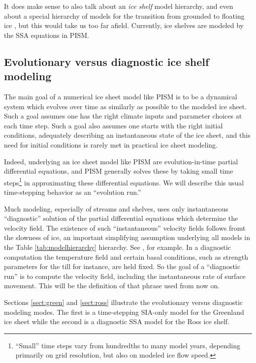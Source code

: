 \documentclass[11pt,final]{amsart}
\begin{document}
It does make sense to also talk about an \emph{ice shelf} model hierarchy, and even about a special hierarchy of models for the transition from grounded to floating ice \cite{SchoofMarine1}, but this would take us too far afield.  Currently, ice shelves are modeled by the SSA equations in PISM.


\subsection{Evolutionary versus diagnostic ice shelf modeling} \label{subsect:basicmodes}    The main goal of a numerical ice sheet model like PISM is to be a dynamical system which evolves over time as similarly as possible to the modeled ice sheet.  Such a goal assumes one has the right climate inputs and parameter choices at each time step.  Such a goal also assumes one starts with the right initial conditions, adequately describing an instantaneous state of the ice sheet, and this need for initial conditions is rarely met in practical ice sheet modeling.  

Indeed, underlying an ice sheet model like PISM are evolution-in-time partial differential equations, and PISM generally solves these by taking small time steps\footnote{``Small'' time steps vary from hundredths to many model years, depending primarily on grid resolution, but also on modeled ice flow speed.} in approximating these differential equations.  We will describe this usual time-stepping behavior as an ``evolution run.''

Much modeling, especially of streams and shelves, uses only instantaneous ``diagnostic'' solution of the partial differential equations which determine the velocity field.  The existence of such ``instantaneous'' velocity fields follows fromt the slowness of ice, an important simplifying assumption underlying all models in the Table \ref{tab:modelhierarchy} hierarchy.  See \cite{Fowler}, for example.  In a diagnostic computation the temperature field and certain basal conditions, such as strength parameters for the till for instance, are held fixed.  So the goal of a ``diagnostic run'' is to compute the velocity field, including the instantaneous rate of surface movement.  This will be the definition of that phrase used from now on.

Sections \ref{sect:green} and \ref{sect:ross} illustrate the evolutionary versus diagnostic modeling modes.  The first is a time-stepping SIA-only model for the Greenland ice sheet while the second is a diagnostic SSA model for the Ross ice shelf.
\end{document}
